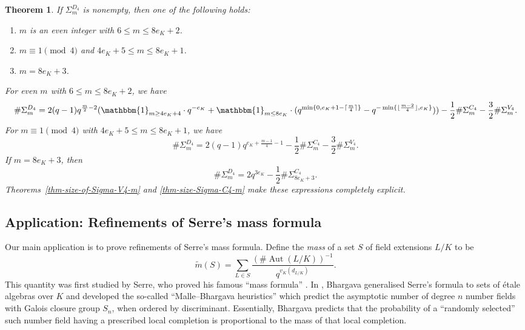 \documentclass[11pt]{amsart}
\theoremstyle{theorem}
\newtheorem{theorem}{Theorem}
\theoremstyle{example}
\theoremstyle{definition}
\numberwithin{theorem}{section}
\numberwithin{theorem}{section}
\DeclareMathOperator{\Aut}{Aut}
\newcommand{\m}{\widetilde{m}}
\begin{document}
\begin{theorem}
    \label{thm-size-of-Sigma_m_D4}
    If $\Sigma_{m}^{D_4}$ is nonempty, then one of the following holds:
    \begin{enumerate}
        \item $m$ is an even integer with $6  \leq m \leq 8e_K + 2$.
        \item $m\equiv 1 \pmod{4}$ and $4e_K + 5 \leq m \leq 8e_K + 1$. 
        \item $m = 8e_K + 3$. 
    \end{enumerate} 
    For even $m$ with $6 \leq m \leq 8e_K + 2$, we have 
    $$
    \#\Sigma_{m}^{D_4} = 2(q-1)q^{\frac{m}{2} - 2}(\mathbbm{1}_{m \geq 4e_K + 4}\cdot q^{-e_K} +\mathbbm{1}_{m \leq 8e_K}\cdot ( q^{\min\{0, e_K + 1 - \lceil \frac{m}{4}\rceil\} }- q^{-\min\{\lfloor \frac{m-2}{4}\rfloor, e_K\}})) - \frac{1}{2}\#\Sigma_m^{C_4} - \frac{3}{2}\#\Sigma_m^{V_4}. 
    $$
    For $m\equiv 1\pmod{4}$ with $4e_K + 5 \leq m \leq 8e_K + 1$, we have 
    $$
    \#\Sigma_{m}^{D_4} = 2(q-1)q^{e_K + \frac{m-1}{4} - 1} - \frac{1}{2}\#\Sigma_m^{C_4} - \frac{3}{2}\#\Sigma_m^{V_4}. 
    $$
    If $m = 8e_K + 3$, then 
    $$
    \#\Sigma_{m}^{D_4} = 2q^{3e_K} - \frac{1}{2}\#\Sigma_{8e_K + 3}^{C_4}.
    $$
    Theorems~\ref{thm-size-of-Sigma-V4-m} and \ref{thm-size-Sigma-C4-m} make these expressions completely explicit.
\end{theorem}

\subsection{Application: Refinements of Serre's mass formula}

Our main application is to prove refinements of Serre's mass formula. Define the \emph{mass} of a set $S$ of field extensions $L/K$ to be 
$$
\m(S) = \sum_{L \in S} \frac{(\#\Aut(L/K))^{-1}}{q^{v_K(d_{L/K})}}.
$$
This quantity was first studied by Serre, who proved his famous ``mass formula'' \cite[Theorem~2]{serre}. In \cite{bhargava-serre-mass-formula}, Bhargava generalised Serre's formula to sets of \'etale algebras over $K$ and developed the so-called ``Malle--Bhargava heuristics'' which predict the asymptotic number of degree $n$ number fields with Galois closure group $S_n$, when ordered by discriminant. Essentially, Bhargava predicts that the probability of a ``randomly selected'' such number field having a prescribed local completion is proportional to the mass of that local completion. 
\end{document}
